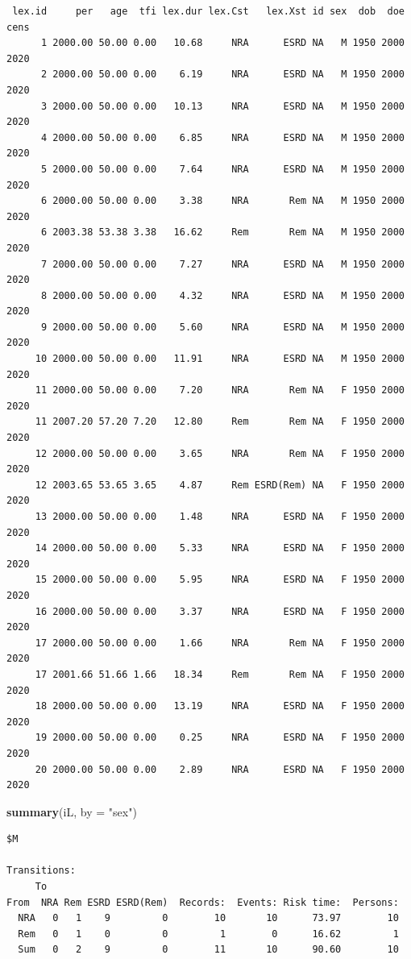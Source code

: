\documentclass[
]{book}
\newenvironment{Shaded}{\begin{snugshade}}{\end{snugshade}}
\newcommand{\AttributeTok}[1]{\textcolor[rgb]{0.13,0.29,0.53}{#1}}
\newcommand{\FunctionTok}[1]{\textcolor[rgb]{0.13,0.29,0.53}{\textbf{#1}}}
\newcommand{\NormalTok}[1]{#1}
\newcommand{\StringTok}[1]{\textcolor[rgb]{0.31,0.60,0.02}{#1}}
\begin{document}
\begin{enumerate}
\begin{verbatim}
 lex.id     per   age  tfi lex.dur lex.Cst   lex.Xst id sex  dob  doe cens
      1 2000.00 50.00 0.00   10.68     NRA      ESRD NA   M 1950 2000 2020
      2 2000.00 50.00 0.00    6.19     NRA      ESRD NA   M 1950 2000 2020
      3 2000.00 50.00 0.00   10.13     NRA      ESRD NA   M 1950 2000 2020
      4 2000.00 50.00 0.00    6.85     NRA      ESRD NA   M 1950 2000 2020
      5 2000.00 50.00 0.00    7.64     NRA      ESRD NA   M 1950 2000 2020
      6 2000.00 50.00 0.00    3.38     NRA       Rem NA   M 1950 2000 2020
      6 2003.38 53.38 3.38   16.62     Rem       Rem NA   M 1950 2000 2020
      7 2000.00 50.00 0.00    7.27     NRA      ESRD NA   M 1950 2000 2020
      8 2000.00 50.00 0.00    4.32     NRA      ESRD NA   M 1950 2000 2020
      9 2000.00 50.00 0.00    5.60     NRA      ESRD NA   M 1950 2000 2020
     10 2000.00 50.00 0.00   11.91     NRA      ESRD NA   M 1950 2000 2020
     11 2000.00 50.00 0.00    7.20     NRA       Rem NA   F 1950 2000 2020
     11 2007.20 57.20 7.20   12.80     Rem       Rem NA   F 1950 2000 2020
     12 2000.00 50.00 0.00    3.65     NRA       Rem NA   F 1950 2000 2020
     12 2003.65 53.65 3.65    4.87     Rem ESRD(Rem) NA   F 1950 2000 2020
     13 2000.00 50.00 0.00    1.48     NRA      ESRD NA   F 1950 2000 2020
     14 2000.00 50.00 0.00    5.33     NRA      ESRD NA   F 1950 2000 2020
     15 2000.00 50.00 0.00    5.95     NRA      ESRD NA   F 1950 2000 2020
     16 2000.00 50.00 0.00    3.37     NRA      ESRD NA   F 1950 2000 2020
     17 2000.00 50.00 0.00    1.66     NRA       Rem NA   F 1950 2000 2020
     17 2001.66 51.66 1.66   18.34     Rem       Rem NA   F 1950 2000 2020
     18 2000.00 50.00 0.00   13.19     NRA      ESRD NA   F 1950 2000 2020
     19 2000.00 50.00 0.00    0.25     NRA      ESRD NA   F 1950 2000 2020
     20 2000.00 50.00 0.00    2.89     NRA      ESRD NA   F 1950 2000 2020
\end{verbatim}

\begin{Shaded}
\begin{Highlighting}[]
\FunctionTok{summary}\NormalTok{(iL, }\AttributeTok{by =} \StringTok{"sex"}\NormalTok{)}
\end{Highlighting}
\end{Shaded}

\begin{verbatim}
$M

Transitions:
     To
From  NRA Rem ESRD ESRD(Rem)  Records:  Events: Risk time:  Persons:
  NRA   0   1    9         0        10       10      73.97        10
  Rem   0   1    0         0         1        0      16.62         1
  Sum   0   2    9         0        11       10      90.60        10


\end{verbatim}
\end{enumerate}
\end{document}
